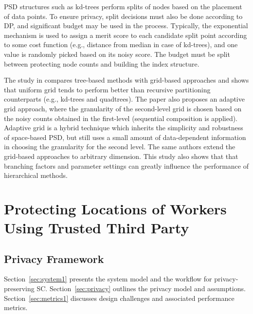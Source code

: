 \documentclass{USC-Thesis}
\numberwithin{equation}{chapter}
\begin{document}
PSD structures such as kd-trees \cite{cormode2012differentially} perform splits of nodes based on the placement of data points. To ensure privacy, split decisions must also be done according to DP, and significant budget may be used in the process. Typically, the exponential mechanism \cite{cormode2012differentially} is used to assign a merit score to each candidate split point according to some cost function (e.g., distance from median in case of kd-trees), and one value is randomly picked based on its noisy score. The budget must be split between protecting node counts and building the index structure.

The study in \cite{qardaji2012differentially} compares tree-based methods with grid-based approaches and shows that uniform grid tends to perform better than recursive partitioning counterparts (e.g., kd-trees and quadtrees). The paper also proposes an adaptive grid approach, where the granularity of the second-level grid is chosen based on the noisy counts obtained in the first-level (sequential composition is applied). Adaptive grid is a hybrid technique which inherits the simplicity and robustness of space-based PSD, but still uses a small amount of data-dependent information in choosing the granularity for the second level. The same authors \cite{qardaji2013understanding} extend the grid-based approaches to arbitrary dimension. This study also shows that that branching factors and parameter settings can greatly influence the performance of hierarchical methods.



\section{Protecting Locations of Workers Using Trusted Third Party}

\subsection{Privacy Framework}
\label{sec:fwork}
Section~\ref{sec:system1} presents the system model and the workflow for privacy-preserving SC.
Section~\ref{sec:privacy} outlines the privacy model and assumptions.  
Section~\ref{sec:metrics1} discusses design challenges and associated performance metrics.
\end{document}

